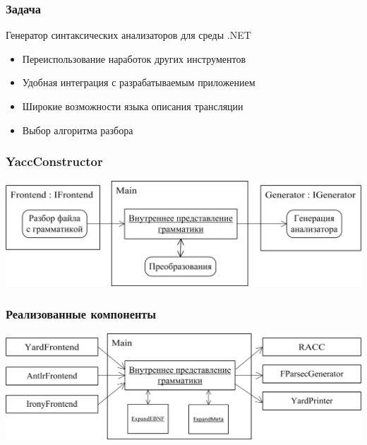 \documentclass{beamer}
\begin{document}

\begin{frame}
	\transwipe[direction=90]
	\frametitle{Задача}
Генератор синтаксических анализаторов для среды .NET
	\begin{itemize}
		\item Переиспользование наработок других инструментов
		\item Удобная интеграция с разрабатываемым приложением
		\item Широкие возможности языка описания трансляции
		\item Выбор алгоритма разбора
	\end{itemize}
\end{frame}


\begin{frame}
	\transwipe[direction=90]
	\frametitle{YaccConstructor}
\begin{center}
{\includegraphics[scale=0.7]{arch.png}} %
\end{center}
\end{frame}

\begin{frame}
	\transwipe[direction=90]
	\frametitle{Реализованные компоненты}
\begin{center}
{\includegraphics[scale=0.7]{components.png}}
\end{center}
\end{frame}
\end{document}
